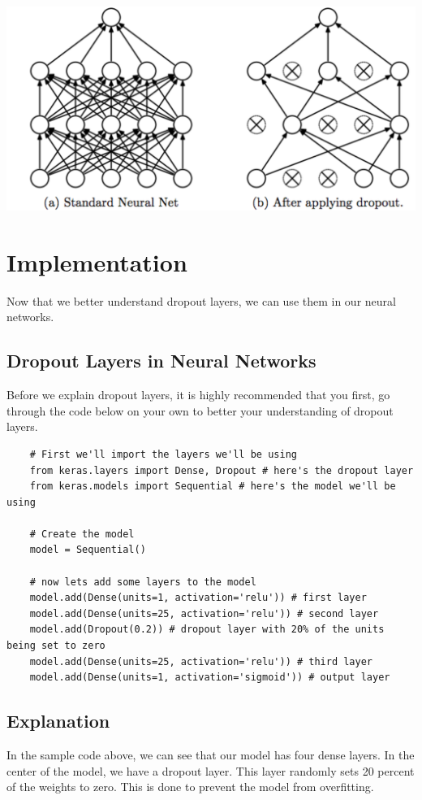 \documentclass[11pt]{report}
\begin{document}
\begin{center}
    \includegraphics[scale=0.2]{./images/dropoutexample.png}
\end{center}



\chapter{Implementation}
Now that we better understand dropout layers, we can use them in our neural networks.

\section{Dropout Layers in Neural Networks}
Before we explain dropout layers, it is highly recommended that you first, go through the code below on your own to better your understanding of dropout layers.

\begin{verbatim}
    # First we'll import the layers we'll be using
    from keras.layers import Dense, Dropout # here's the dropout layer
    from keras.models import Sequential # here's the model we'll be using

    # Create the model
    model = Sequential()

    # now lets add some layers to the model
    model.add(Dense(units=1, activation='relu')) # first layer
    model.add(Dense(units=25, activation='relu')) # second layer
    model.add(Dropout(0.2)) # dropout layer with 20% of the units being set to zero
    model.add(Dense(units=25, activation='relu')) # third layer
    model.add(Dense(units=1, activation='sigmoid')) # output layer
\end{verbatim}

\section{Explanation}
In the sample code above, we can see that our model has four dense layers. In the center of the model, we have a dropout layer. This layer randomly sets 20 percent of the weights to zero. This is done to prevent the model from overfitting. 
\end{document}
